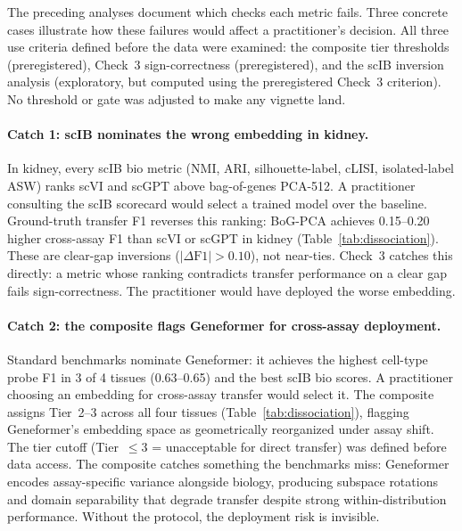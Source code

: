 \documentclass[9pt,lineno]{elife}
\begin{document}
The preceding analyses document which checks each metric fails. Three concrete cases illustrate how these failures would affect a practitioner's decision. All three use criteria defined before the data were examined: the composite tier thresholds (preregistered), Check~3 sign-correctness (preregistered), and the scIB inversion analysis (exploratory, but computed using the preregistered Check~3 criterion). No threshold or gate was adjusted to make any vignette land.

\paragraph{Catch 1: scIB nominates the wrong embedding in kidney.} In kidney, every scIB bio metric (NMI, ARI, silhouette-label, cLISI, isolated-label ASW) ranks scVI and scGPT above bag-of-genes PCA-512. A practitioner consulting the scIB scorecard would select a trained model over the baseline. Ground-truth transfer F1 reverses this ranking: BoG-PCA achieves 0.15--0.20 higher cross-assay F1 than scVI or scGPT in kidney (Table~\ref{tab:dissociation}). These are clear-gap inversions ($|\Delta\text{F1}| > 0.10$), not near-ties. Check~3 catches this directly: a metric whose ranking contradicts transfer performance on a clear gap fails sign-correctness. The practitioner would have deployed the worse embedding.

\paragraph{Catch 2: the composite flags Geneformer for cross-assay deployment.} Standard benchmarks nominate Geneformer: it achieves the highest cell-type probe F1 in 3 of 4 tissues (0.63--0.65) and the best scIB bio scores. A practitioner choosing an embedding for cross-assay transfer would select it. The composite assigns Tier~2--3 across all four tissues (Table~\ref{tab:dissociation}), flagging Geneformer's embedding space as geometrically reorganized under assay shift. The tier cutoff (Tier~$\leq 3$ = unacceptable for direct transfer) was defined before data access. The composite catches something the benchmarks miss: Geneformer encodes assay-specific variance alongside biology, producing subspace rotations and domain separability that degrade transfer despite strong within-distribution performance. Without the protocol, the deployment risk is invisible.
\end{document}
